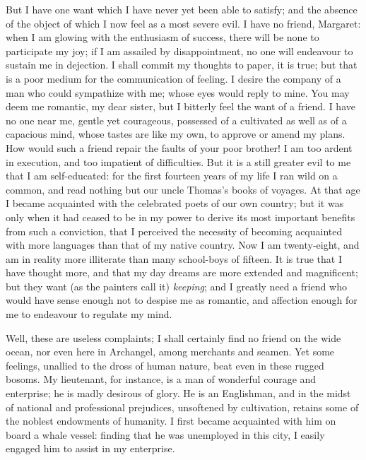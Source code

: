 But I have one want which I have
never yet been able to satisfy; and
the absence of the object of which I
now feel as a most severe evil. I have
no friend, Margaret: when I am glowing
with the enthusiasm of success,
there will be none to participate my
joy; if I am assailed by disappointment,
no one will endeavour to sustain
me in dejection. I shall commit my
thoughts to paper, it is true; but that
is a poor medium for the communication
of feeling. I desire the company
of a man who could sympathize with
me; whose eyes would reply to mine.
You may deem me romantic, my dear
sister, but I bitterly feel the want of a
friend. I have no one near me, gentle
yet courageous, possessed of a cultivated
as well as of a capacious mind,
whose tastes are like my own, to
approve or amend my plans. How would
such a friend repair the faults of your
poor brother! I am too ardent in execution,
and too impatient of difficulties.
But it is a still greater evil to me
that I am self-educated: for the first
fourteen years of my life I ran wild on
a common, and read nothing but our
uncle Thomas's books of voyages. At
that age I became acquainted with the
celebrated poets of our own country;
but it was only when it had ceased to be
in my power to derive its most important
benefits from such a conviction, that I
perceived the necessity of becoming
acquainted with more languages than
that of my native country. Now I am
twenty-eight, and am in reality more
illiterate than many school-boys of fifteen.
It is true that I have thought
more, and that my day dreams are
more extended and magnificent; but
they want (as the painters call it)
\emph{keeping}; and I greatly need a friend
who would have sense enough not to
despise me as romantic, and affection
enough for me to endeavour to regulate
my mind.

Well, these are useless complaints; I
shall certainly find no friend on the
wide ocean, nor even here in Archangel,
among merchants and seamen. Yet
some feelings, unallied to the dross of
human nature, beat even in these rugged
bosoms. My lieutenant, for instance,
is a man of wonderful courage
and enterprise; he is madly desirous of
glory. He is an Englishman, and in
the midst of national and professional
prejudices, unsoftened by cultivation,
retains some of the noblest endowments
of humanity. I first became acquainted
with him on board a whale vessel: finding
that he was unemployed in this
city, I easily engaged him to assist in
my enterprise.

